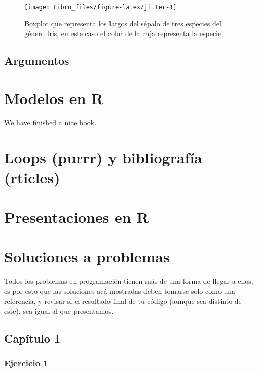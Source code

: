 \documentclass[]{book}
\begin{document}
\begin{figure}

{\centering \texttt{[image: Libro\_files/figure-latex/jitter-1]} 

}

\caption{Boxplot que representa los largos del sépalo de tres especies del género Iris, en este caso el color de la caja representa la especie}\label{fig:jitter}
\end{figure}

\hypertarget{argumentos}{%
\section{Argumentos}\label{argumentos}}

\hypertarget{modelos}{%
\chapter{Modelos en R}\label{modelos}}

We have finished a nice book.

\hypertarget{loops}{%
\chapter{Loops (purrr) y bibliografía (rticles)}\label{loops}}

\hypertarget{presentacion}{%
\chapter{Presentaciones en R}\label{presentacion}}

\hypertarget{soluciones}{%
\chapter{Soluciones a problemas}\label{soluciones}}

Todos los problemas en programación tienen más de una forma de llegar a
ellos, es por esto que las soluciones acá mostradas deben tomarse solo
como una referencia, y revisar si el resultado final de tu código
(aunque sea distinto de este), sea igual al que presentamos.

\hypertarget{capitulo-1}{%
\section{Capítulo 1}\label{capitulo-1}}

\hypertarget{ejercicio-1-3}{%
\subsection{Ejercicio 1}\label{ejercicio-1-3}}
\end{document}
